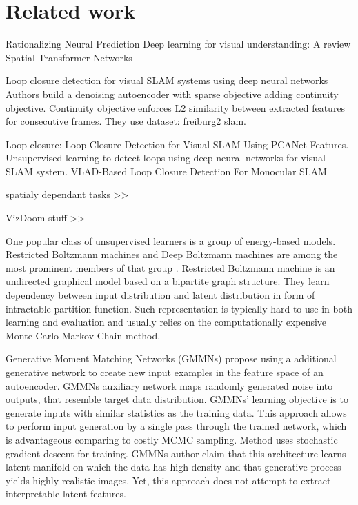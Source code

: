 
\chapter{Related work}

Rationalizing Neural Prediction \cite{Lei2016}
Deep learning for visual understanding: A review \cite{Guo2016}
Spatial Transformer Networks \cite{Jaderberg2015}

Loop closure detection for visual SLAM systems using deep neural networks \cite{Gao2015}
Authors build a denoising autoencoder with sparse objective adding continuity objective.
Continuity objective enforces L2 similarity between extracted features for consecutive frames. They use dataset: freiburg2 slam.

Loop closure:
Loop Closure Detection for Visual SLAM Using PCANet Features.
Unsupervised learning to detect loops using deep neural networks for visual SLAM system.
VLAD-Based Loop Closure Detection For Monocular SLAM \cite{Xia2016, Gao2015a, Huang2016}

spatialy dependant tasks >>

VizDoom stuff >>

One popular class of unsupervised learners is a group of energy-based models.
Restricted Boltzmann machines and Deep Boltzmann machines are among the most prominent members of that group \cite{Ackley1985, Salakhutdinov2009}.
Restricted Boltzmann machine is an undirected graphical model based on a bipartite graph structure.
They learn dependency between input distribution and latent distribution in form of intractable partition function.
Such representation is typically hard to use in both learning and evaluation and usually relies on the computationally expensive Monte Carlo Markov Chain method.


Generative Moment Matching Networks (GMMNs) \cite{Li2015, Ren2016} propose using a additional generative network to create new input examples in the feature space of an autoencoder.
GMMNs auxiliary network maps randomly generated noise into outputs, that resemble target data distribution. GMMNs' learning objective is to generate inputs with similar statistics as the training data.
This approach allows to perform input generation by a single pass through the trained network, which is advantageous comparing to costly MCMC sampling.
Method uses stochastic gradient descent for training. GMMNs author claim that this architecture learns latent manifold on which the data has high density and that generative process yields highly realistic images.
Yet, this approach does not attempt to extract interpretable latent features.

